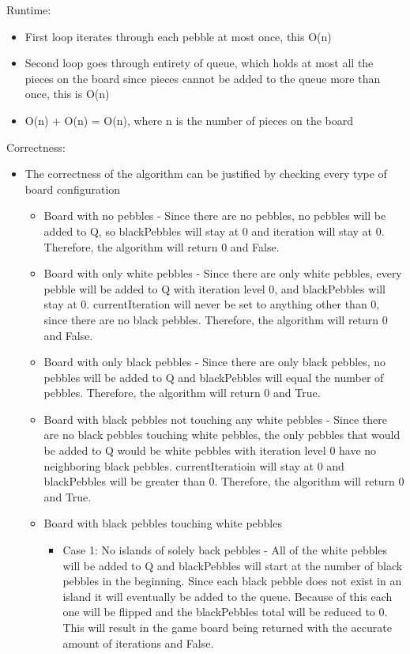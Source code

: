 \documentclass{article}
\begin{document}
\pagebreak
\begin{flushleft}
Runtime:
\end{flushleft}
\begin{itemize}
\item{First loop iterates through each pebble at most once, this O(n)}
\item{Second loop goes through entirety of queue, which holds at most all the pieces on the board since pieces cannot be added to the queue more than once, this is O(n)}
\item{O(n) + O(n) = O(n), where n is the number of pieces on the board}
\end{itemize}
Correctness:
\begin{itemize}
\item{The correctness of the algorithm can be justified by checking every type of board configuration}
	\begin{itemize}
		\item {Board with no pebbles - Since there are no pebbles, no pebbles will be added to Q, so blackPebbles will stay at 0 and iteration will stay at 0. Therefore, the algorithm will return 0 and False.}
		\item {Board with only white pebbles - Since there are only white pebbles, every pebble will be added to Q with iteration level 0, and blackPebbles will stay at 0. currentIteration will never be set to anything other than 0, since there are no black pebbles. Therefore, the algorithm will return 0 and False.}
		\item {Board with only black pebbles - Since there are only black pebbles, no pebbles will be added to Q and blackPebbles will equal the number of pebbles. Therefore, the algorithm will return 0 and True.}
		\item {Board with black pebbles not touching any white pebbles - Since there are no black pebbles touching white pebbles, the only pebbles that would be added to Q would be white pebbles with iteration level 0 have no neighboring black pebbles. currentIteratioin will stay at 0 and blackPebbles will be greater than 0. Therefore, the algorithm will return 0 and True.}
		\item {Board with black pebbles touching white pebbles}
		\begin{itemize}
			\item {Case 1: No islands of solely back pebbles - All of the white pebbles will be added to Q and blackPebbles will start at the number of black pebbles in the beginning. Since each black pebble does not exist in an island it will eventually be added to the queue. Because of this each one will be flipped and the blackPebbles total will be reduced to 0. This will result in the game board being returned with the accurate amount of iterations and False.}


\end{itemize}
\end{itemize}
\end{itemize}
\end{document}
